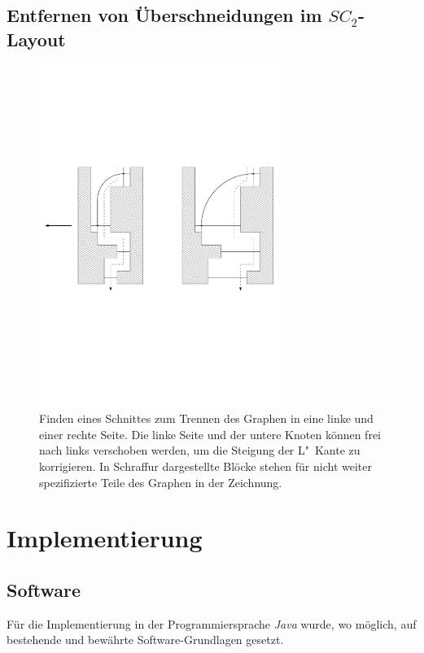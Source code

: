 \documentclass[a4paper]{scrreprt}
\theoremstyle{definition}
\begin{document}
\section{Entfernen von Überschneidungen im $SC_2$-Layout}

\begin{figure}[h]
  \centering
  \includegraphics[width=0.7\textwidth]{cut_L_slope_correction}
  \caption{Finden eines Schnittes zum Trennen des Graphen in eine linke und einer rechte Seite. Die linke Seite und der untere Knoten können frei nach links verschoben werden, um die Steigung der L"~Kante zu korrigieren. In Schraffur dargestellte Blöcke stehen für nicht weiter spezifizierte Teile des Graphen in der Zeichnung.}
  \label{fig:cutLslopecorrection}
\end{figure}






\chapter{Implementierung}

\section{Software}

Für die Implementierung in der Programmiersprache \emph{Java} wurde, wo möglich, auf bestehende und bewährte Software-Grundlagen gesetzt.
\end{document}
